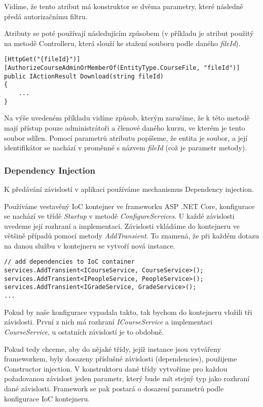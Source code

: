 Vidíme, že tento atribut má konstruktor se dvěma parametry, které následně předá autorizačnímu filtru. 

Atributy se poté používají následujícím způsobem (v příkladu je atribut použitý na metodě Controlleru, která slouží ke stažení souboru podle daného \textit{fileId}).

\newpage

\begin{lstlisting}
[HttpGet("{fileId}")]
[AuthorizeCourseAdminOrMemberOf(EntityType.CourseFile, "fileId")]
public IActionResult Download(string fileId)
{
	...
}
\end{lstlisting}

Na výše uvedeném příkladu vidíme způsob, kterým zaručíme, že k této metodě mají přístup pouze administrátoři a členové daného kurzu, ve kterém je tento soubor sdílen. Pomocí parametrů atributu popíšeme, že entita je soubor, a její identifikátor se nachází v proměnné s názvem \textit{fileId} (což je parametr metody).

\subsubsection*{Dependency Injection}

K předávání závislostí v aplikaci používáme mechanismus Dependency injection. 

Používáme vestavěný IoC kontejner ve frameworku ASP .NET Core, konfigurace se nachází ve třídě \textit{Startup} v metodě \textit{ConfigureServices}.
U každé závislosti uvedeme její rozhraní a implementaci. 
Závislosti vkládáme do kontejneru ve většině případů pomocí metody \textit{AddTransient}. To znamená, že při každém dotazu na danou službu v kontejneru se vytvoří nová instance.
\begin{lstlisting}
// add dependencies to IoC container
services.AddTransient<ICourseService, CourseService>();
services.AddTransient<IPeopleService, PeopleService>();
services.AddTransient<IGradeService, GradeService>();
...
\end{lstlisting}
Pokud by naše konfigurace vypadala takto, tak bychom do kontejneru vložili tři závislosti. První z nich má rozhraní \textit{ICourseService} a implementaci \textit{CourseService}, u ostatních závislostí je to obdobně.

Pokud tedy chceme, aby do nějaké třídy, jejíž instance jsou vytvářeny frameworkem, byly dosazeny příslušné závislosti (dependencies), použijeme Constructor injection. V konstruktoru dané třídy vytvoříme pro každou požadovanou závislost jeden parametr, který bude mít stejný typ jako rozhraní dané závislosti. Framework se pak postará o dosazení parametrů podle konfigurace IoC kontejneru.

